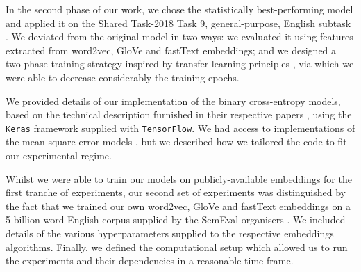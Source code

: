 In the second phase of our work, we chose the statistically best-performing model and applied it on the Shared Task-2018 Task 9, general-purpose, English subtask \citep{camacho2018semeval}.  We deviated from the original model \citep{bernier2018crim} in two ways: we evaluated it using features extracted from word2vec, GloVe and fastText embeddings; and we designed a two-phase training strategy inspired by transfer learning principles \citep{howard2018universal}, via which we were able to decrease considerably the training epochs.

We provided details of our implementation of the binary cross-entropy models, based on the technical description furnished in their respective papers \citep{yamane2016distributional, bernier2018crim}, using the \texttt{Keras} framework supplied with \texttt{TensorFlow}.  We had access to implementations of the mean square error models \citep{Fu2014, ustalov2017negative}, but we described how we tailored the code to fit our experimental regime.

Whilst we were able to train our models on publicly-available embeddings for the first tranche of experiments, our second set of experiments was distinguished by the fact that we trained our own word2vec, GloVe and fastText embeddings on a 5-billion-word English corpus supplied by the SemEval organisers \citep{camacho2018semeval}.  We included details of the various hyperparameters supplied to the respective embeddings algorithms.  Finally, we defined the  computational setup which allowed us to run the experiments and their dependencies in a reasonable time-frame.